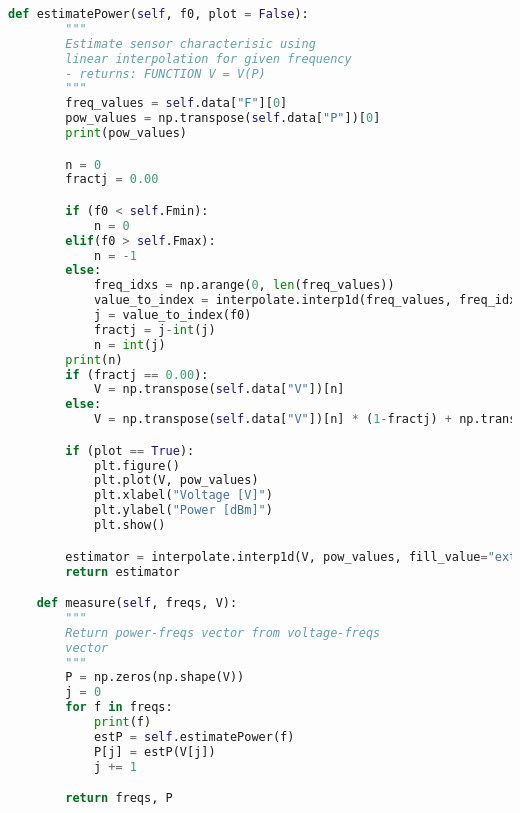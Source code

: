 \begin{lstlisting}[language=Python]
    def estimatePower(self, f0, plot = False):
        """
        Estimate sensor characterisic using
        linear interpolation for given frequency
        - returns: FUNCTION V = V(P)
        """
        freq_values = self.data["F"][0]
        pow_values = np.transpose(self.data["P"])[0]
        print(pow_values)

        n = 0
        fractj = 0.00

        if (f0 < self.Fmin):
            n = 0
        elif(f0 > self.Fmax):
            n = -1
        else:
            freq_idxs = np.arange(0, len(freq_values))
            value_to_index = interpolate.interp1d(freq_values, freq_idxs, kind='linear')
            j = value_to_index(f0)
            fractj = j-int(j)
            n = int(j)
        print(n)
        if (fractj == 0.00):
            V = np.transpose(self.data["V"])[n]
        else:
            V = np.transpose(self.data["V"])[n] * (1-fractj) + np.transpose(self.data["V"])[n+1] * (fractj)

        if (plot == True):
            plt.figure()
            plt.plot(V, pow_values)
            plt.xlabel("Voltage [V]")
            plt.ylabel("Power [dBm]")
            plt.show()

        estimator = interpolate.interp1d(V, pow_values, fill_value="extrapolate")
        return estimator

    def measure(self, freqs, V):
        """
        Return power-freqs vector from voltage-freqs
        vector
        """
        P = np.zeros(np.shape(V))
        j = 0
        for f in freqs:
            print(f)
            estP = self.estimatePower(f)
            P[j] = estP(V[j])
            j += 1

        return freqs, P
\end{lstlisting}